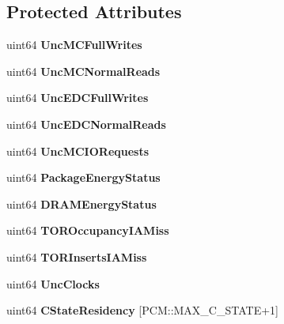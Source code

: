 \subsection*{Protected Attributes}
\begin{DoxyCompactItemize}
\item 
\mbox{\label{class_uncore_counter_state_a3e59bb4c79f6040b17b104194a5e29fb}} 
uint64 {\bfseries Unc\+M\+C\+Full\+Writes}
\item 
\mbox{\label{class_uncore_counter_state_a5a07c23a907365682137c5d8c1cf79ad}} 
uint64 {\bfseries Unc\+M\+C\+Normal\+Reads}
\item 
\mbox{\label{class_uncore_counter_state_a933afbcf1236a619c7459e84b55b0528}} 
uint64 {\bfseries Unc\+E\+D\+C\+Full\+Writes}
\item 
\mbox{\label{class_uncore_counter_state_ac5a6269e7564fd952331a78e2cb47adb}} 
uint64 {\bfseries Unc\+E\+D\+C\+Normal\+Reads}
\item 
\mbox{\label{class_uncore_counter_state_a4c3d0db74283d9420d9089e2c2553561}} 
uint64 {\bfseries Unc\+M\+C\+I\+O\+Requests}
\item 
\mbox{\label{class_uncore_counter_state_a74bdee47e68bbc55c2ee023fc3bfe76d}} 
uint64 {\bfseries Package\+Energy\+Status}
\item 
\mbox{\label{class_uncore_counter_state_a03c78bbb9fb36c84c075b8d72fc5eed9}} 
uint64 {\bfseries D\+R\+A\+M\+Energy\+Status}
\item 
\mbox{\label{class_uncore_counter_state_ad9c072ee0fdc984b82d0c143a186ce37}} 
uint64 {\bfseries T\+O\+R\+Occupancy\+I\+A\+Miss}
\item 
\mbox{\label{class_uncore_counter_state_a92b8e5a10e1b634824a6a17049a777bd}} 
uint64 {\bfseries T\+O\+R\+Inserts\+I\+A\+Miss}
\item 
\mbox{\label{class_uncore_counter_state_a515a8614f806f057d4a092a9f4a5c473}} 
uint64 {\bfseries Unc\+Clocks}
\item 
\mbox{\label{class_uncore_counter_state_a5819f82036b4386ca638d0755cdc7388}} 
uint64 {\bfseries C\+State\+Residency} \mbox{[}P\+C\+M\+::\+M\+A\+X\+\_\+\+C\+\_\+\+S\+T\+A\+TE+1\mbox{]}
\end{DoxyCompactItemize}
